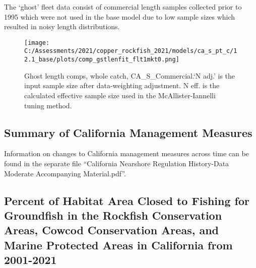 \documentclass[11pt,
  english,
  a4paper,
]{article}
\begin{document}

The `ghost' fleet data consist of commercial length samples collected prior to 1995 which were not used in the base model due to low sample sizes which resulted in noisy length distributions.

\leavevmode\tagmcend\tagstructend\par


\begin{figure}
\centering
\texttt{[image: C:/Assessments/2021/copper\_rockfish\_2021/models/ca\_s\_pt\_c/12.1\_base/plots/comp\_gstlenfit\_flt1mkt0.png]}
\caption{Ghost length comps, whole catch, CA\_S\_Commercial.`N adj.' is the input sample size after data-weighting adjustment. N eff. is the calculated effective sample size used in the McAllister-Iannelli tuning method.\label{fig:comp_gstlenfit_flt1mkt0}}
\end{figure}

\tagmcend\tagstructend


\hypertarget{ca-man}{%
\subsection{Summary of California Management Measures}\label{ca-man}}

\leavevmode\tagmcend\tagstructend


Information on changes to California management measures across time can be found in the separate file ``California Nearshore Regulation History-Data Moderate Accompanying Material.pdf''.

\leavevmode\tagmcend\tagstructend\par


\hypertarget{ca-closed-open}{%
\subsection{Percent of Habitat Area Closed to Fishing for Groundfish in the Rockfish Conservation Areas, Cowcod Conservation Areas, and Marine Protected Areas in California from 2001-2021}\label{ca-closed-open}}

\leavevmode\tagmcend\tagstructend
\end{document}
